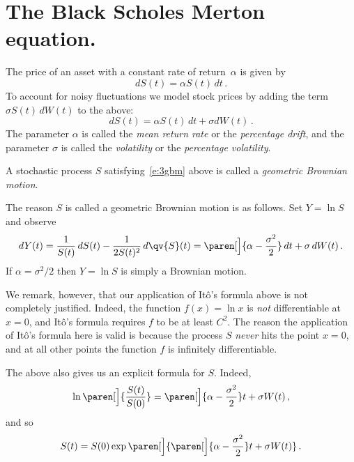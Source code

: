 \section{The Black Scholes Merton equation.}

The price of an asset with a constant rate of return~$\alpha$ is given by
\begin{equation*}
  dS(t) = \alpha S(t) \, dt\,.
\end{equation*}
To account for noisy fluctuations we model stock prices by adding the term $\sigma S(t) \, dW(t)$ to the above:
\begin{equation}\label{e:3gbm}
  dS(t) = \alpha S(t) \, dt + \sigma dW(t)\,.
\end{equation}
The parameter $\alpha$ is called the \emph{mean return rate} or the \emph{percentage drift}, and the parameter $\sigma$ is called the \emph{volatility} or the \emph{percentage volatility}.

\begin{definition}
  A stochastic process $S$ satisfying~\eqref{e:3gbm} above is called a \emph{geometric Brownian motion}.
\end{definition}

The reason $S$ is called a geometric Brownian motion is as follows.
Set $Y = \ln S$ and observe
\begin{equation*}
  dY(t) = \frac{1}{S(t)} \, dS(t) - \frac{1}{2 S(t)^2} \, d\qv{S}(t)
    = \paren[\Big]{\alpha - \frac{\sigma^2}{2}} \, dt + \sigma \, dW(t)\,.
\end{equation*}
If $\alpha = \sigma^2/2$ then $Y = \ln S$ is simply a Brownian motion.

We remark, however, that our application of It\^o's formula above is not completely justified.
Indeed, the function $f(x) = \ln x$ is \emph{not} differentiable at $x = 0$, and It\^o's formula requires $f$ to be at least $C^2$.
The reason the application of It\^o's formula here is valid is because the process $S$ \emph{never} hits the point $x = 0$, and at all other points the function $f$ is infinitely differentiable.

The above also gives us an explicit formula for $S$.
Indeed,
\begin{equation*}
  \ln\paren[\Big]{ \frac{S(t)}{S(0)} }
    = \paren[\Big]{\alpha - \frac{\sigma^2}{2}} t + \sigma W(t)\,,
\end{equation*}
and so
\begin{equation}\label{e:3gbmFor}
  S(t) = S(0) \exp\paren[\Big]{
    \paren[\Big]{\alpha - \frac{\sigma^2}{2}} t + \sigma W(t)
  }\,.
\end{equation}

